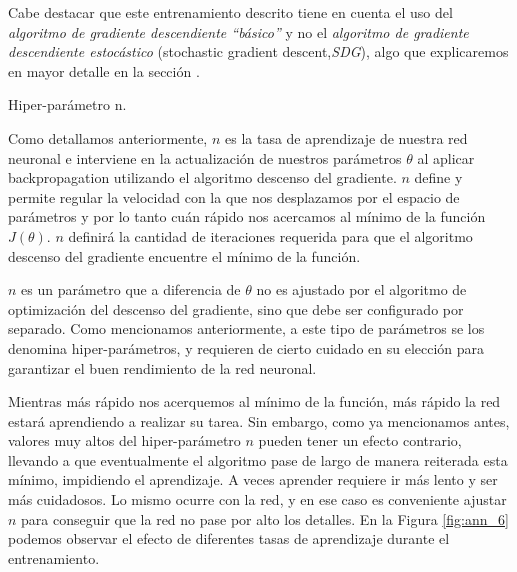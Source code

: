 \documentclass[12pt,a4paper]{article}
\makeatletter
\renewcommand\paragraph{\@startsection{paragraph}{4}{\z@}
            {-2.5ex\@plus -1ex \@minus -.25ex}
            {1.25ex \@plus .25ex}
            {\normalfont\normalsize\bfseries}}
\makeatother
\begin{document}
\begin{sloppypar}
\begin{enumerate}
\end{enumerate}

Cabe destacar que este entrenamiento descrito tiene en cuenta el uso del \textit{algoritmo de gradiente descendiente “básico”} y no el \textit{algoritmo de gradiente descendiente estocástico} (stochastic gradient descent,\textit{SDG}), algo que explicaremos en mayor detalle en la sección \textit{}.

\paragraph{Hiper-parámetro n.}\label{hiper_n}

Como detallamos anteriormente, $n$ es la tasa de aprendizaje de nuestra red neuronal e interviene en la actualización de nuestros parámetros  $\theta$ al aplicar backpropagation utilizando el algoritmo descenso del gradiente. $n$ define y permite regular la velocidad con la que nos desplazamos por el espacio de parámetros y por lo tanto cuán rápido nos acercamos al mínimo de la función $J(\theta)$. $n$ definirá la cantidad de iteraciones requerida para que el algoritmo descenso del gradiente encuentre el mínimo de la función.

$n$ es un parámetro que a diferencia de $\theta$ no es ajustado por el algoritmo de optimización del descenso del gradiente, sino que debe ser configurado por separado. Como mencionamos anteriormente, a este tipo de parámetros se los denomina hiper-parámetros, y requieren de cierto cuidado en su elección para garantizar el buen rendimiento de la red neuronal. 

Mientras más rápido nos acerquemos al mínimo de la función, más rápido la red estará aprendiendo a realizar su tarea. Sin embargo, como ya mencionamos antes, valores muy altos del hiper-parámetro $n$ pueden tener un efecto contrario, llevando a que eventualmente el algoritmo pase de largo de manera reiterada esta mínimo, impidiendo el aprendizaje. A veces aprender requiere ir más lento y ser más cuidadosos. Lo mismo ocurre con la red, y en ese caso es conveniente ajustar $n$ para conseguir que la red no pase por alto los detalles. En la Figura \ref{fig:ann_6} podemos observar el efecto de diferentes tasas de aprendizaje durante el entrenamiento. 


\end{sloppypar}
\end{document}
